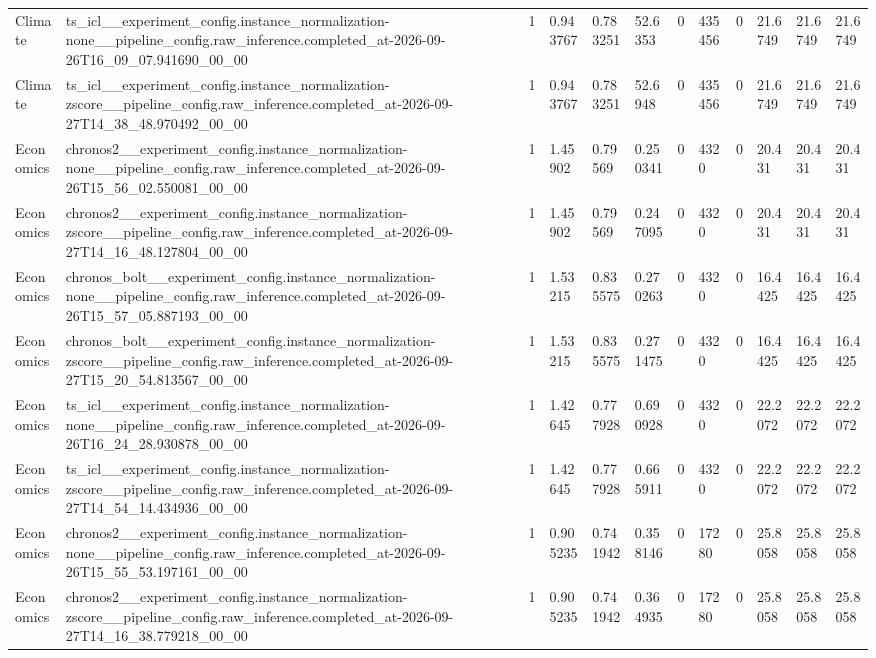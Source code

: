 \begin{tabular}{llllllllllll}
Climate & ts\_icl\_\_experiment\_config.instance\_normalization-none\_\_pipeline\_config.raw\_inference.completed\_at-2026-09-26T16\_09\_07.941690\_00\_00 & 1 & 0.943767 & 0.783251 & 52.6353 & 0 & 435456 & 0 & 21.6749 & 21.6749 & 21.6749 \\
Climate & ts\_icl\_\_experiment\_config.instance\_normalization-zscore\_\_pipeline\_config.raw\_inference.completed\_at-2026-09-27T14\_38\_48.970492\_00\_00 & 1 & 0.943767 & 0.783251 & 52.6948 & 0 & 435456 & 0 & 21.6749 & 21.6749 & 21.6749 \\
Economics & chronos2\_\_experiment\_config.instance\_normalization-none\_\_pipeline\_config.raw\_inference.completed\_at-2026-09-26T15\_56\_02.550081\_00\_00 & 1 & 1.45902 & 0.79569 & 0.250341 & 0 & 4320 & 0 & 20.431 & 20.431 & 20.431 \\
Economics & chronos2\_\_experiment\_config.instance\_normalization-zscore\_\_pipeline\_config.raw\_inference.completed\_at-2026-09-27T14\_16\_48.127804\_00\_00 & 1 & 1.45902 & 0.79569 & 0.247095 & 0 & 4320 & 0 & 20.431 & 20.431 & 20.431 \\
Economics & chronos\_bolt\_\_experiment\_config.instance\_normalization-none\_\_pipeline\_config.raw\_inference.completed\_at-2026-09-26T15\_57\_05.887193\_00\_00 & 1 & 1.53215 & 0.835575 & 0.270263 & 0 & 4320 & 0 & 16.4425 & 16.4425 & 16.4425 \\
Economics & chronos\_bolt\_\_experiment\_config.instance\_normalization-zscore\_\_pipeline\_config.raw\_inference.completed\_at-2026-09-27T15\_20\_54.813567\_00\_00 & 1 & 1.53215 & 0.835575 & 0.271475 & 0 & 4320 & 0 & 16.4425 & 16.4425 & 16.4425 \\
Economics & ts\_icl\_\_experiment\_config.instance\_normalization-none\_\_pipeline\_config.raw\_inference.completed\_at-2026-09-26T16\_24\_28.930878\_00\_00 & 1 & 1.42645 & 0.777928 & 0.690928 & 0 & 4320 & 0 & 22.2072 & 22.2072 & 22.2072 \\
Economics & ts\_icl\_\_experiment\_config.instance\_normalization-zscore\_\_pipeline\_config.raw\_inference.completed\_at-2026-09-27T14\_54\_14.434936\_00\_00 & 1 & 1.42645 & 0.777928 & 0.665911 & 0 & 4320 & 0 & 22.2072 & 22.2072 & 22.2072 \\
Economics & chronos2\_\_experiment\_config.instance\_normalization-none\_\_pipeline\_config.raw\_inference.completed\_at-2026-09-26T15\_55\_53.197161\_00\_00 & 1 & 0.905235 & 0.741942 & 0.358146 & 0 & 17280 & 0 & 25.8058 & 25.8058 & 25.8058 \\
Economics & chronos2\_\_experiment\_config.instance\_normalization-zscore\_\_pipeline\_config.raw\_inference.completed\_at-2026-09-27T14\_16\_38.779218\_00\_00 & 1 & 0.905235 & 0.741942 & 0.364935 & 0 & 17280 & 0 & 25.8058 & 25.8058 & 25.8058 \\

\end{tabular}
